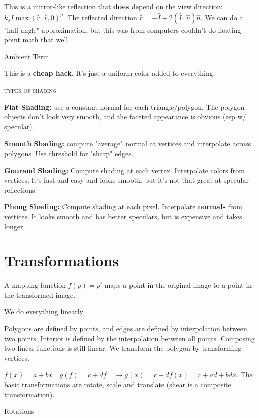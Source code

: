 \documentclass{article}
\begin{document}
This is a mirror-like reflection that {\bf does} depend on the view direction: $k_sI\max(\hat{r}\cdot\hat{v},0)^p$. The reflected direction $\hat{r}=-\hat{I}+2(\hat{I}\cdot\hat{n})\hat{n}$. We can do a "half angle" approximation, but this was from computers couldn't do floating point math that well.

\vspace{10pt}
Ambient Term

This is a {\bf cheap hack}. It's just a uniform color added to everything.

\begin{center}\textsc{types of shading}\end{center} 
	
{\bf Flat Shading:}  use a constant normal for each triangle/polygon. The polygon objects don't look very smooth, and the faceted appearance is obvious (esp w/ specular).

{\bf Smooth Shading:}  compute "average" normal at vertices and interpolate across polygons. Use threshold for "sharp" edges.

{\bf Gouraud Shading:} Compute shading at each vertex. Interpolate colors from vertices. It's fast and easy and looks smooth, but it's not that great at specular reflections.

{\bf Phong Shading:} Compute shading at each pixel. Interpolate {\bf normals} from vertices. It looks smooth and has better speculars, but is expensive and takes longer.

\section{Transformations} %
\label{sec:transformations}
A mapping function $f(p) = p'$ maps a point in the original image to a point in the transformed image.

\vspace{10pt}
We do everything linearly

Polygons are defined by points, and edges are defined by interpolation between two points. Interior is defined by the interpolation between all points. Composing two linear functions is still linear. We transform the polygon by transforming vertices.

$f(x)=a+bx\quad g(f) = c+df \quad \rightarrow g(x)=c+df(x)=c+ad+bdx$. The basic transformations are rotate, scale and translate (shear is a composite transformation). 

\vspace{10pt}
Rotations
\end{document}
